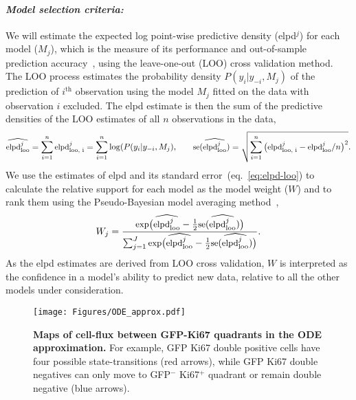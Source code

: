 \documentclass[11pt]{article}
\newcommand{\para}[1]{\vspace*{-4.5mm}\paragraph{#1}}
\begin{document}
\para{\textit{Model selection criteria:}}
We will estimate the expected log point-wise predictive density (elpd$^{j}$) for each model ($M_{j}$), which is the measure of its performance and out-of-sample prediction accuracy~\citep{Vehtari:2016}, using the leave-one-out (LOO) cross validation method. 
The LOO process estimates the probability density $P(y_i | y_{-i}, M_j)$ of the prediction of $i^\text{th}$ observation using the model $M_j$ fitted on the data with observation $i$ excluded.
The elpd estimate is then the sum of the predictive densities of the LOO estimates of all $n$ observations in the data,
\begin{equation} 
\small
\widehat{\text{elpd}^j_\text{loo}} = \sum_{i=1}^n  \text{elpd}^j_\text{loo, i}  = \sum_{i=1}^n \log(P(y_i | y_{-i}, M_j), \qquad \text{se}(\widehat{\text{elpd}^j_\text{loo}})  = \sqrt{\sum_{i=1}^n  \big(\text{elpd}^j_\text{loo, i} - \text{elpd}^j_\text{loo}/n \big)^2 }.
\label{eq:elpd-loo}
\end{equation}
We use the estimates of {elpd} and its standard error~(eq.~\ref{eq:elpd-loo}) to calculate the relative support for each model as the model weight ($W$) and  to rank them using the Pseudo-Bayesian model averaging method~\citep{Yao:2018},
\begin{equation} \small
W_j = \frac{\text{exp}\big(\widehat{\text{elpd}^j_\text{loo}} - \frac{1}{2}\text{se}(\widehat{\text{elpd}^j_\text{loo}})\big)}{\sum_{j=1}^J \text{exp}\big(\widehat{\text{elpd}^j_\text{loo}} - \frac{1}{2}\text{se}(\widehat{\text{elpd}^j_\text{loo}})\big)}.
\label{eq:model-weights}
\end{equation} 
As the {elpd} estimates are derived from LOO cross validation, $W$ is interpreted as the confidence in a model's ability to predict new data, relative to all the other models under consideration.

\begin{wrapfigure}{r}{0.22\textwidth}
\centering
\vspace*{-4mm}
\texttt{[image: Figures/ODE\_approx.pdf]}
\vspace*{-7mm}
\caption{\textbf{Maps of cell-flux between GFP-Ki67 quadrants in the ODE approximation.} 
For example, GFP Ki67 double positive cells have four possible state-transitions (red arrows), while GFP Ki67 double negatives can only move to GFP$^-$ Ki67$^+$ quadrant or remain double negative (blue arrows).}
\vspace*{-6mm}
\label{fig:ode_approx}
\end{wrapfigure}
\end{document}
